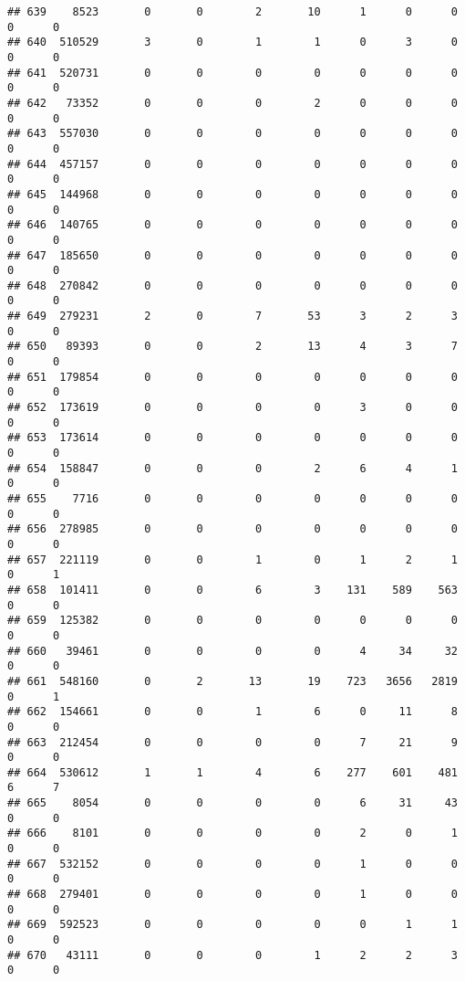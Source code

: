 \documentclass[
]{article}
\begin{document}
\begin{verbatim}
## 639    8523       0       0        2       10      1      0      0     0      0
## 640  510529       3       0        1        1      0      3      0     0      0
## 641  520731       0       0        0        0      0      0      0     0      0
## 642   73352       0       0        0        2      0      0      0     0      0
## 643  557030       0       0        0        0      0      0      0     0      0
## 644  457157       0       0        0        0      0      0      0     0      0
## 645  144968       0       0        0        0      0      0      0     0      0
## 646  140765       0       0        0        0      0      0      0     0      0
## 647  185650       0       0        0        0      0      0      0     0      0
## 648  270842       0       0        0        0      0      0      0     0      0
## 649  279231       2       0        7       53      3      2      3     0      0
## 650   89393       0       0        2       13      4      3      7     0      0
## 651  179854       0       0        0        0      0      0      0     0      0
## 652  173619       0       0        0        0      3      0      0     0      0
## 653  173614       0       0        0        0      0      0      0     0      0
## 654  158847       0       0        0        2      6      4      1     0      0
## 655    7716       0       0        0        0      0      0      0     0      0
## 656  278985       0       0        0        0      0      0      0     0      0
## 657  221119       0       0        1        0      1      2      1     0      1
## 658  101411       0       0        6        3    131    589    563     0      0
## 659  125382       0       0        0        0      0      0      0     0      0
## 660   39461       0       0        0        0      4     34     32     0      0
## 661  548160       0       2       13       19    723   3656   2819     0      1
## 662  154661       0       0        1        6      0     11      8     0      0
## 663  212454       0       0        0        0      7     21      9     0      0
## 664  530612       1       1        4        6    277    601    481     6      7
## 665    8054       0       0        0        0      6     31     43     0      0
## 666    8101       0       0        0        0      2      0      1     0      0
## 667  532152       0       0        0        0      1      0      0     0      0
## 668  279401       0       0        0        0      1      0      0     0      0
## 669  592523       0       0        0        0      0      1      1     0      0
## 670   43111       0       0        0        1      2      2      3     0      0

\end{verbatim}
\end{document}
